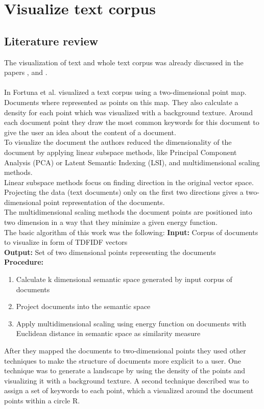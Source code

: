 \section{Visualize text corpus}

\subsection{Literature review}

The visualization of text and whole text corpus was already discussed in the papers  \cite{visualiuationCorpus1},  \cite{visualiuationCorpus2} and \cite{visualiuationCorpus3}. \\
\\
In  \cite{visualiuationCorpus1} Fortuna et al. visualized a text corpus using a two-dimensional point map. Documents where represented as points on this map. They also calculate a density for each point which was visualized with a background texture. Around each document point they draw the most common keywords for this document to give the user an idea about the content of a document. \\
To visualize the document the authors reduced the dimensionality of the document by applying linear subspace methods, like Principal Component Analysis (PCA) or Latent Semantic Indexing (LSI), and multidimensional scaling methods. \\
Linear subspace methods focus on finding direction in the original vector space. Projecting the data (text documents) only on the first two directions gives a
two-dimensional point representation of the documents. \\
The multidimensional scaling methods the document points are positioned into two dimension in a way that they minimize a given energy function. \\
The basic algorithm of this work was the following: 
\textbf{Input:} Corpus of documents to visualize in form of TDFIDF vectors \\
\textbf{Output: } Set of two dimensional points representing the documents \\
\textbf{Procedure: } \\
\begin{enumerate}
	\item Calculate k dimensional semantic space generated by input corpus of documents
	\item Project documents into the semantic space
	\item Apply multidimensional scaling using energy function on documents with Euclidean distance in semantic space as similarity measure
\end{enumerate} 
After they mapped the documents to two-dimensional points they used other techniques to make the structure of documents more explicit to a user. One technique was to generate a landscape by using the density of the points and visualizing it with a  background texture. A second technique described was to assign a set of keywords to each point, which a visualized around the document points within a circle R. \\
~\\


